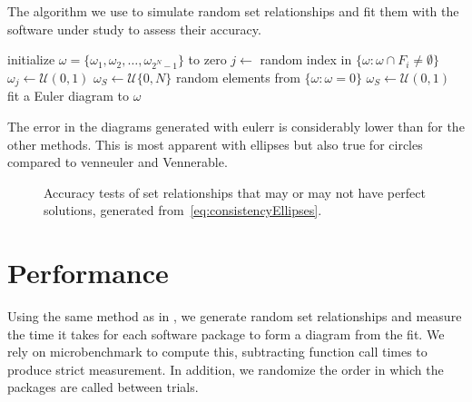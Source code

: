 \documentclass[
  a4paper,
  nofonts,
  nobib,
  nohyper,
  openany
]{tufte-book}\usepackage[]{graphicx}\usepackage[]{color}
\makeatletter
\newenvironment{kframe}{%
 \def\at@end@of@kframe{}%
 \ifinner\ifhmode%
  \def\at@end@of@kframe{\end{minipage}}%
  \begin{minipage}{\columnwidth}%
 \fi\fi%
 \def\FrameCommand##1{\hskip\@totalleftmargin \hskip-\fboxsep
 \colorbox{shadecolor}{##1}\hskip-\fboxsep
     \hskip-\linewidth \hskip-\@totalleftmargin \hskip\columnwidth}%
 \MakeFramed {\advance\hsize-\width
   \@totalleftmargin\z@ \linewidth\hsize
   \@setminipage}}%
 {\par\unskip\endMakeFramed%
 \at@end@of@kframe}
\newenvironment{knitrout}{}{} %
\newcommand{\pkg}[1]{{\fontseries{b}\selectfont #1}}
\makeatother
\begin{document}
\begin{algorithm}[htb]
\caption{The algorithm we use to simulate random set relationships and fit them with the software under study to assess their accuracy.}
\label{alg:accuracy}
\begin{algorithmic}[1]

  \STATE initialize $\omega = \{\omega_1,\omega_2,\dots,\omega_{2^N-1} \}$ to zero
    \STATE $j \leftarrow$ random index in $\{\omega : \omega \cap F_i \neq \emptyset\}$
    \STATE $\omega_j \leftarrow \mathcal{U}(0, 1)$
  \ENDFOR
  \STATE $\omega_S \leftarrow \mathcal{U}\{0, N\}$ random elements from $\{\omega : \omega = 0\}$
  \STATE $\omega_S \leftarrow \mathcal{U}(0, 1)$
  \STATE fit a Euler diagram to $\omega$
\ENDFOR
\end{algorithmic}
\end{algorithm}

The error in the diagrams generated with \pkg{eulerr} is considerably lower than for the other methods. This is most apparent with ellipses but also true for circles compared to \pkg{venneuler} and \pkg{Vennerable}.

\begin{figure}[hbt]
\begin{knitrout}
\color{fgcolor}\begin{kframe}


{\ttfamily\noindent\bfseries\color{errorcolor}{\#\# Error in eval(lhs, parent, parent): object 'data\_accuracy' not found}}\end{kframe}
\end{knitrout}
\caption{Accuracy tests of set relationships that may or may not have perfect solutions, generated from~\eqref{eq:consistencyEllipses}.}
\label{fig:accuracy}
\end{figure}

\section{Performance}
\label{sec:performance}

Using the same method as in , we generate random set relationships and measure the time it takes for each software package to form a diagram from the fit. We rely on \pkg{microbenchmark} to compute this, subtracting function call times to produce strict measurement. In addition, we randomize the order in which the packages are called between trials.
\end{document}
